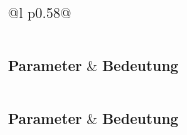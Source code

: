 {\footnotesize
\begin{longtable}{@{}l p{}@{}}
\caption{Startparameter des Knotens \texttt{vision\_pose\_uxrce\_node}}
\label{tab:vision_pose_params} \\
\toprule
\textbf{Parameter} & \textbf{Bedeutung} \\
\midrule
\endfirsthead

 \\
\toprule
\textbf{Parameter} & \textbf{Bedeutung} \\
\midrule
\endhead

\midrule
{} \\
\endfoot

\bottomrule
\endlastfoot


\end{longtable}}
